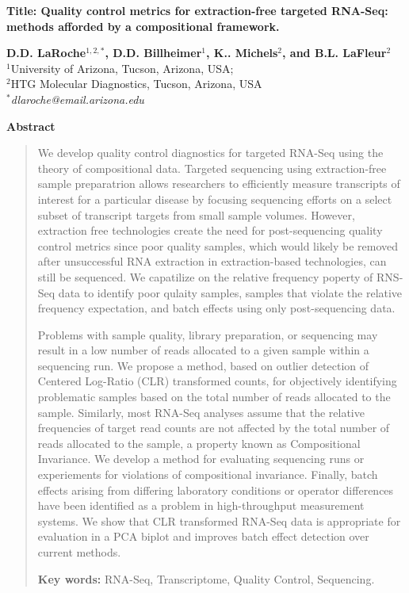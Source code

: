 \documentclass [10pt]{article}
\theoremstyle{definition}
\begin{document}
\begin{center}
\textbf{\large Title: Quality control metrics for extraction-free targeted RNA-Seq: methods afforded by a compositional framework.}

\bigskip
\textbf{D.D. LaRoche}$^{1,2,*}$\textbf{, D.D. Billheimer}$^{1}$\textbf{, K.. Michels}$^{2}$\textbf{, and B.L. LaFleur}$^{2}$ \\
{\small
$^{1}$University of Arizona, Tucson, Arizona, USA;  \\
$^{2}$HTG Molecular Diagnostics, Tucson, Arizona, USA \\
$^{*}$\textit{dlaroche@email.arizona.edu}}
\end{center}

\bigskip
{\centerline{\bf Abstract}}

\begin{quote}
We develop quality control diagnostics for targeted RNA-Seq using the theory of compositional data.  Targeted sequencing using extraction-free sample preparatrion allows researchers to efficiently measure transcripts of interest for a particular disease by focusing sequencing efforts on a select subset of transcript targets from small sample volumes.  However, extraction free technologies create the need for post-sequencing quality control metrics since poor quality samples, which would likely be removed after unsuccessful RNA extraction in extraction-based technologies, can still be sequenced. We capatilize on the relative frequency poperty of RNS-Seq data to identify poor qulaity samples, samples that violate the relative frequency expectation, and batch effects using only post-sequencing data.

Problems with sample quality, library preparation, or sequencing may result in a low number of reads allocated to a given sample within a sequencing run. We propose a method, based on outlier detection of Centered Log-Ratio (CLR) transformed counts, for objectively identifying problematic samples based on the total number of reads allocated to the sample. Similarly, most RNA-Seq analyses assume that the relative frequencies of target read counts are not affected by the total number of reads allocated to the sample, a property known as Compositional Invariance.  We develop a method for evaluating sequencing runs or experiements for violations of compositional invariance. Finally, batch effects arising from differing laboratory conditions or operator differences have been identified as a problem in high-throughput measurement systems.  We show that CLR transformed RNA-Seq data is appropriate for evaluation in a PCA biplot and improves batch effect detection over current methods.


\medskip

{\bf Key words: } RNA-Seq, Transcriptome, Quality Control, Sequencing. \par
\end{quote}
\end{document}
